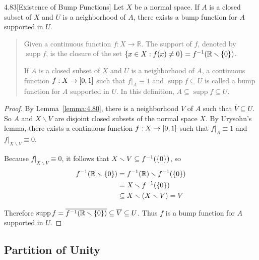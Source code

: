 \begin{corollary}{4.83}[Existence of Bump Functions]
	Let $X$ be a normal space. If $A$ is a closed subset of $X$ and $U$ is a neighborhood of $A$, there exists a bump function for $A$ supported in $U$.
\end{corollary}

\begin{quote}
	Given a continuous function $f: X \to \mathbb{R}$. The support of $f$, denoted by $\operatorname{supp} f$, is the closure of the set $\left\{{ x\in X : f(x) \ne 0 }\right\} = f^{-1}(\mathbb{R}\smallsetminus\left\{{0}\right\})$.

	If $A$ is a closed subset of $X$ and $U$ is a neighborhood of $A$, a continuous function $f: X\to \left[{0, 1}\right]$ such that $f\vert_{A} \equiv 1$ and $\operatorname{supp} f \subseteq U$ is called a bump function for $A$ supported in $U$. In this definition, $A \subseteq \operatorname{supp} f \subseteq U$.
\end{quote}

\begin{proof}
	By Lemma~\ref{lemma:4.80}, there is a neighborhood $V$ of $A$ such that $\overline{V} \subseteq U$. So $A$ and $X\smallsetminus V$ are disjoint closed subsets of the normal space $X$. By Urysohn's lemma, there exists a continuous function $f: X \to \left[{0, 1}\right]$ such that $f\vert_{A}\equiv 1$ and $f\vert_{X\smallsetminus V}\equiv 0$.

	Because $f\vert_{X\smallsetminus V} \equiv 0$, it follows that $X\smallsetminus V \subseteq f^{-1}(\left\{{0}\right\})$, so
	\begin{align*}
		f^{-1}(\mathbb{R}\smallsetminus\left\{{0}\right\}) & = f^{-1}(\mathbb{R}) \smallsetminus f^{-1}(\left\{{0}\right\}) \\
		                                        & = X \smallsetminus f^{-1}(\left\{{0}\right\})                  \\
		                                        & \subseteq X\smallsetminus (X\smallsetminus V) = V
	\end{align*}

	Therefore $\operatorname{supp} f = \overline{f^{-1}(\mathbb{R}\smallsetminus\left\{{0}\right\})} \subseteq \overline{V} \subseteq U$. Thus $f$ is a bump function for $A$ supported in $U$.
\end{proof}

\subsection*{Partition of Unity}

